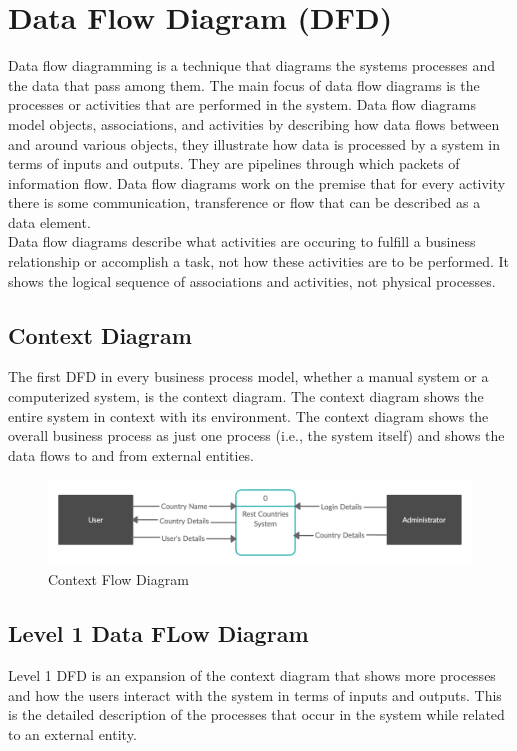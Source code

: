 \documentclass[twoside, a4paper, 12pt]{report}
\begin{document}
\section{Data Flow Diagram (DFD)}
Data flow diagramming is a technique that diagrams the systems processes and the data that pass among them. The main focus of data flow diagrams is the processes or activities that are performed in the system. Data flow diagrams model objects, associations, and activities by describing how data flows between and around various objects, they illustrate how data is processed by a system in terms of inputs and outputs. They are pipelines through which packets of information flow. Data flow diagrams work on the premise that for every activity there is some communication, transference or flow that can be described as a data element.\\
\indent
Data flow diagrams describe what activities are occuring to fulfill a business relationship or accomplish a task, not how these activities are to be performed. It shows the logical sequence of associations and activities, not physical processes.

\subsection{Context Diagram}
The first DFD in every business process model, whether a manual system or a computerized system, is the context diagram. The context diagram shows the entire system in context with its environment. The context diagram shows the overall business process as just one process (i.e., the system itself) and shows the data flows to and from external entities.

\begin{figure} [h]
	\centering
	\includegraphics[width=1.0\textwidth]{CFD.png}
	\caption{Context Flow Diagram}
	\label{fig:context-flow-diagram}
\end{figure}

\subsection{Level 1 Data FLow Diagram}
Level 1 DFD is an expansion of the context diagram that shows more processes and how the users interact with the system in terms of inputs and outputs. This is the detailed description of the processes that occur in the system while related to an external entity.
\end{document}
